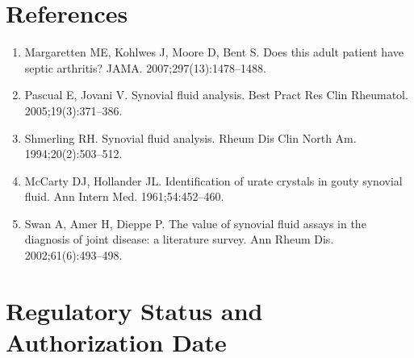 \section*{References}
\begin{enumerate}
  \item Margaretten ME, Kohlwes J, Moore D, Bent S. Does this adult patient have septic arthritis? JAMA. 2007;297(13):1478--1488.
  \item Pascual E, Jovani V. Synovial fluid analysis. Best Pract Res Clin Rheumatol. 2005;19(3):371--386.
  \item Shmerling RH. Synovial fluid analysis. Rheum Dis Clin North Am. 1994;20(2):503--512.
  \item McCarty DJ, Hollander JL. Identification of urate crystals in gouty synovial fluid. Ann Intern Med. 1961;54:452--460.
  \item Swan A, Amer H, Dieppe P. The value of synovial fluid assays in the diagnosis of joint disease: a literature survey. Ann Rheum Dis. 2002;61(6):493--498.
\end{enumerate}
\clearpage
\section*{Regulatory Status and Authorization Date}

\clearpage
